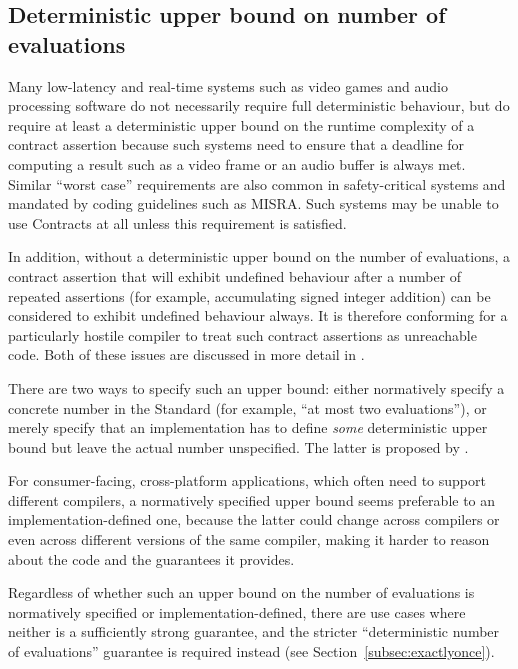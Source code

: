 


\subsection{Deterministic upper bound on number of evaluations}
\label{subsec:upper}

Many low-latency and real-time systems such as video games and audio processing software do not necessarily require full deterministic behaviour, but do require at least a deterministic upper bound on the runtime complexity of a contract assertion because such systems need to ensure that a deadline for computing a result such as a video frame or an audio buffer is always met. Similar ``worst case'' requirements are also common in safety-critical systems and mandated by coding guidelines such as MISRA. Such systems may be unable to use Contracts at all unless this requirement is satisfied.

In addition, without a deterministic upper bound on the number of evaluations, a contract assertion that will exhibit undefined behaviour after a number of repeated assertions (for example, accumulating signed integer addition) can be considered to exhibit undefined behaviour always. It is therefore conforming for a particularly hostile compiler to treat such contract assertions as unreachable code. Both of these issues are discussed in more detail in \cite{P3119R0}.

There are two ways to specify such an upper bound: either normatively specify a concrete number in the Standard (for example, ``at most two evaluations''), or merely specify that an implementation has to define \emph{some} deterministic upper bound but leave the actual number unspecified. The latter is proposed by \cite{P3119R0}.

For consumer-facing, cross-platform applications, which often need to support different compilers, a normatively specified upper bound seems preferable to an implementation-defined one, because the latter could change across compilers or even across different versions of the same compiler, making it harder to reason about the code and the guarantees it provides.

Regardless of whether such an upper bound on the number of evaluations is normatively specified or implementation-defined, there are use cases where neither is a sufficiently strong guarantee, and the stricter ``deterministic number of evaluations'' guarantee is required instead (see Section~\ref{subsec:exactlyonce}).

